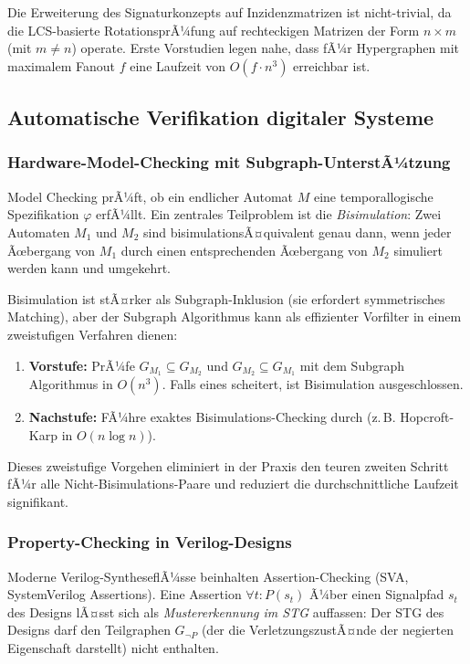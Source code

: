﻿\documentclass[a4paper,12pt]{article}
\theoremstyle{definition}
\begin{document}
Die Erweiterung des Signaturkonzepts auf Inzidenzmatrizen ist nicht-trivial, da
die LCS-basierte RotationsprÃ¼fung auf rechteckigen Matrizen der Form $n \times m$
(mit $m \neq n$) operate. Erste Vorstudien legen nahe, dass fÃ¼r Hypergraphen mit
maximalem Fanout $f$ eine Laufzeit von $O(f \cdot n^3)$ erreichbar ist.

\subsection{Automatische Verifikation digitaler Systeme}

\subsubsection{Hardware-Model-Checking mit Subgraph-UnterstÃ¼tzung}

Model Checking \cite{clarke1986automatic} prÃ¼ft, ob ein endlicher Automat $M$ eine
temporallogische Spezifikation $\varphi$ erfÃ¼llt. Ein zentrales Teilproblem ist die
\emph{Bisimulation}: Zwei Automaten $M_1$ und $M_2$ sind bisimulationsÃ¤quivalent genau
dann, wenn jeder Ãœbergang von $M_1$ durch einen entsprechenden Ãœbergang von $M_2$
simuliert werden kann und umgekehrt.

Bisimulation ist stÃ¤rker als Subgraph-Inklusion (sie erfordert symmetrisches Matching),
aber der Subgraph Algorithmus kann als effizienter Vorfilter in einem zweistufigen
Verfahren dienen:
\begin{enumerate}
  \item \textbf{Vorstufe:} PrÃ¼fe $G_{M_1} \subseteq G_{M_2}$ und
        $G_{M_2} \subseteq G_{M_1}$ mit dem Subgraph Algorithmus in $O(n^3)$.
        Falls eines scheitert, ist Bisimulation ausgeschlossen.
  \item \textbf{Nachstufe:} FÃ¼hre exaktes Bisimulations-Checking durch (z.\,B.
        Hopcroft-Karp \cite{hopcroft1971} in $O(n \log n)$).
\end{enumerate}
Dieses zweistufige Vorgehen eliminiert in der Praxis den teuren zweiten Schritt fÃ¼r
alle Nicht-Bisimulations-Paare und reduziert die durchschnittliche Laufzeit
signifikant.

\subsubsection{Property-Checking in Verilog-Designs}

Moderne Verilog-SyntheseflÃ¼sse beinhalten Assertion-Checking (SVA, SystemVerilog
Assertions). Eine Assertion $\forall t: P(s_t)$ Ã¼ber einen Signalpfad $s_t$ des
Designs lÃ¤sst sich als \emph{Mustererkennung im STG} auffassen: Der STG des Designs
darf den Teilgraphen $G_{\neg P}$ (der die VerletzungszustÃ¤nde der negierten
Eigenschaft darstellt) nicht enthalten.
\end{document}
